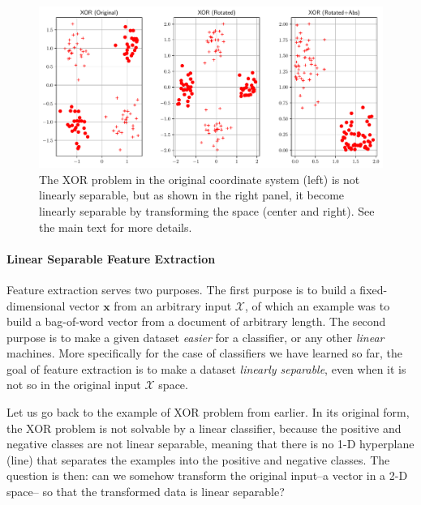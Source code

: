 \documentclass{report}
\newcommand{\vect}[1]{\mathbf{#1}}
\newcommand{\vx}[0]{\vect{x}}
\begin{document}
\begin{figure}
    \centering
    \includegraphics[width=\columnwidth]{figures/xor_transform.pdf}

    \caption{
        \label{fig:xor_transformed}
        The XOR problem in the original coordinate system (left) is not linearly
        separable, but as shown in the right panel, it become linearly
        separable by transforming the space (center and right). See the main
        text for more details.
    }
\end{figure}

\paragraph{Linear Separable Feature Extraction}

Feature extraction serves two purposes. The first purpose is to build a
fixed-dimensional vector $\vx$ from an arbitrary input $\mathcal{X}$, of which
an example was to build a bag-of-word vector from a document of arbitrary
length. The second purpose is to make a given dataset {\it easier} for a
classifier, or any other {\it linear} machines. More specifically for the case
of classifiers we have learned so far, the goal of feature extraction is to make
a dataset {\it linearly separable}, even when it is not so in the original input
$\mathcal{X}$ space. 

Let us go back to the example of XOR problem from earlier. In its original form,
the XOR problem is not solvable by a linear classifier, because the positive and
negative classes are not linear separable, meaning that there is no 1-D
hyperplane (line) that separates the examples into the positive and negative
classes. The question is then: can we somehow transform the original input--a
vector in a 2-D space-- so that the transformed data is linear separable?
\end{document}
